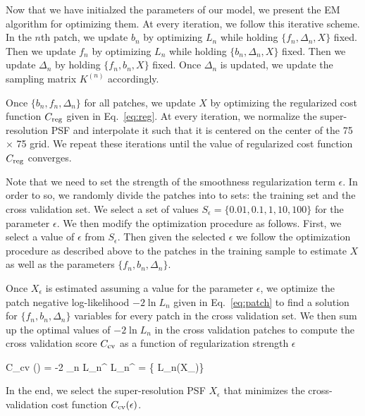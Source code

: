 Now that we have initialzed the parameters of our model, we present the EM algorithm for optimizing them. At every iteration, we follow this 
iterative scheme. In the $n$th patch, we update $b_n$ by optimizing $L_n$ while holding $\{f_n, \Delta_n, X\}$ fixed. Then 
we update $f_n$ by optimizing $L_n$ while holding $\{b_n, \Delta_n, X\}$ fixed. Then we update $\Delta_n$ by holding $\{f_n, b_n, X\}$ fixed. 
Once $\Delta_n$ is updated, we update the sampling matrix $K^{(n)}$ accordingly. 

Once $\{b_n, f_n, \Delta_n\}$ for all patches, we update $X$ 
by optimizing the regularized cost function $C_{\rm reg}$ given in Eq.~\ref{eq:reg}. At every iteration, we normalize the super-resolution PSF and 
interpolate it such that it is centered on the center of the 75 $\times$ 75 grid. We repeat these iterations until the value of regularized cost function 
$C_{\rm reg}$ converges.

Note that we need to set the strength of the smoothness regularization term $\epsilon$. In order to so, we randomly divide the patches into to sets: 
the training set and the cross validation set. We select a set of values $S_{\epsilon} = \{0.01,0.1,1,10,100\}$ for the parameter $\epsilon$. We then modify the optimization 
procedure as follows. First, we select a value of $\epsilon$ from $S_{\epsilon}$. Then given the selected $\epsilon$ we follow the optimization procedure as described above to 
the patches in the training sample to estimate $X$ as well as the parameters $\{f_n,b_n,\Delta_n\}$. 

Once $X_{\epsilon}$ is estimated assuming a value for the parameter $\epsilon$, we optimize the patch negative log-likelihood $-2\ln L_n$ given in Eq.~\ref{eq:patch} to find a solution for $\{f_n,b_n,\Delta_n\}$
variables for every patch in the cross validation set. We then sum up the optimal values of $-2\ln L_n$ in the cross validation patches to compute the cross validation score $C_{\rm cv}$ as a function of 
regularization strength $\epsilon$

\beq
C_{\rm cv} (\epsilon) = -2 \sum_{n} \ln L_{n}^{\star} \;  \; L_{n}^{\star} =  \{ L_{n}(X_{\epsilon})\}
\eeq

In the end, we select the super-resolution PSF $X_{\epsilon}$ that minimizes the cross-validation cost function $C_{\rm cv} (\epsilon)$.


